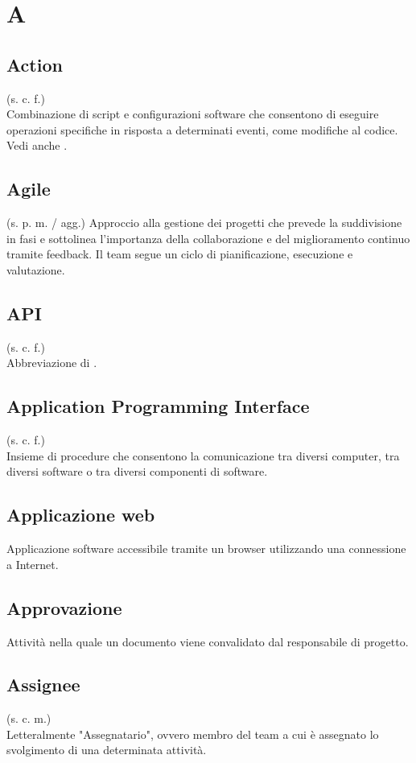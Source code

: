\section{A}
    \subsection{Action}
    (s. c. f.)\\
    Combinazione di script e configurazioni software che consentono di eseguire operazioni 
    specifiche in risposta a determinati eventi, come modifiche al codice.
    Vedi anche .
    \subsection{Agile}
    (s. p. m. / agg.)
    Approccio alla gestione dei progetti che prevede la suddivisione in fasi e sottolinea 
    l'importanza della collaborazione e del miglioramento continuo tramite feedback. 
    Il team segue un ciclo di pianificazione, esecuzione e valutazione.
    \subsection{API}
    (s. c. f.)\\
    Abbreviazione di .
    \subsection{Application Programming Interface}
    \label{Application Programming Interface}
    (s. c. f.)\\
    Insieme di procedure che consentono la comunicazione tra diversi computer, tra diversi 
    software o tra diversi componenti di software.
    \subsection{Applicazione web}
    \label{Applicazione web}
    Applicazione software accessibile tramite un browser utilizzando una 
    connessione a Internet.
    \subsection{Approvazione}
    Attività nella quale un documento viene convalidato dal responsabile di progetto.
    \subsection{Assignee}
    (s. c. m.)\\
    Letteralmente "Assegnatario", ovvero membro del team a cui è assegnato lo
    svolgimento di una determinata attività.

